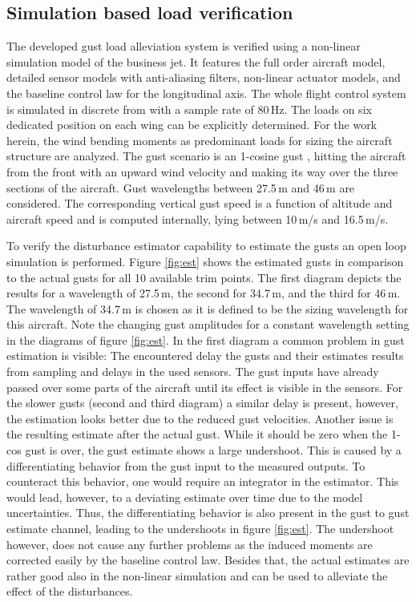 \documentclass[graybox]{svmult}
\begin{document}
\subsection{Simulation based load verification}\label{APPsubsec:sim}
The developed gust load alleviation system is verified using a non-linear simulation model of the business jet. It features the full order aircraft model, detailed sensor models with anti-aliasing filters, non-linear actuator models, and the baseline control law for the longitudinal axis. The whole flight control system is simulated in discrete from with a sample rate of 80\,Hz. The loads on six dedicated position on each wing can be explicitly determined. For the work herein, the wind bending moments as predominant loads for sizing the aircraft structure are analyzed.
The gust scenario is an 1-cosine gust \cite{Flomenhoft94,Fuller95}, hitting the aircraft from the front  with an upward  wind velocity and making its way over the three sections of the aircraft.
Gust wavelengths between  27.5\,m and 46\,m are considered. The corresponding vertical gust speed  is a function of altitude and aircraft speed and is computed internally, lying between 10\,m/s and 16.5\,m/s.

To verify the disturbance estimator capability to estimate the gusts an open loop simulation is performed. Figure \ref{fig:est} shows the estimated gusts in comparison to the actual gusts for all 10 available trim points. The first diagram depicts the results for a wavelength of  27.5\,m, the second for 34.7\,m, and the third for 46\,m. The wavelength of 34.7\,m is chosen as it is defined to be the sizing wavelength for this aircraft. Note the changing gust amplitudes for a constant wavelength setting in the diagrams of figure \ref{fig:est}. In the first diagram a common problem in gust estimation is visible: The encountered delay the gusts and their estimates results from sampling and delays in the used sensors. The gust inputs have already passed over some parts of the aircraft until its effect is visible in the sensors.
For the slower gusts (second and third diagram) a similar delay is present, however, the estimation looks better due to the reduced gust velocities. Another issue is the resulting estimate after the actual gust. While it should be zero when the 1-cos gust is over, the gust estimate shows a large undershoot. 
This is caused by a differentiating behavior from the gust input to the measured outputs. To counteract this behavior, one would require an integrator in the estimator. This would lead, however, to a deviating estimate over time due to the model uncertainties.  Thus, the differentiating behavior is also present in the gust to gust estimate channel, leading to the undershoots in figure  \ref{fig:est}. The undershoot however, does not cause any further problems as the induced moments are corrected easily by the baseline control law.
Besides that, the actual estimates are rather good also in the non-linear simulation and can be used to alleviate the effect of the disturbances.
\end{document}
